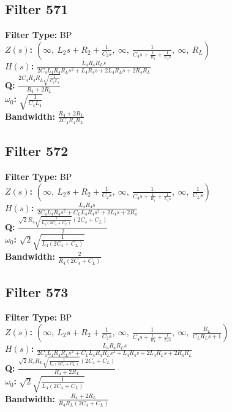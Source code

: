 \documentclass{article}
\begin{document}
\subsection*{Filter 571}
\textbf{Filter Type:} BP \\ 
\textbf{$Z(s)$:} $\left( \infty, \  L_{2} s + R_{2} + \frac{1}{C_{2} s}, \  \infty, \  \frac{1}{C_{4} s + \frac{1}{R_{4}} + \frac{1}{L_{4} s}}, \  \infty, \  R_{L}\right)$ \\ 
\textbf{$H(s)$:} $\frac{L_{4} R_{4} R_{L} s}{2 C_{4} L_{4} R_{4} R_{L} s^{2} + L_{4} R_{4} s + 2 L_{4} R_{L} s + 2 R_{4} R_{L}}$ \\ 
\textbf{Q:} $\frac{2 C_{4} R_{4} R_{L} \sqrt{\frac{1}{C_{4} L_{4}}}}{R_{4} + 2 R_{L}}$ \\ 
\textbf{$\omega_0$:} $\sqrt{\frac{1}{C_{4} L_{4}}}$ \\ 
\textbf{Bandwidth:} $\frac{R_{4} + 2 R_{L}}{2 C_{4} R_{4} R_{L}}$ \\ 
\subsection*{Filter 572}
\textbf{Filter Type:} BP \\ 
\textbf{$Z(s)$:} $\left( \infty, \  L_{2} s + R_{2} + \frac{1}{C_{2} s}, \  \infty, \  \frac{1}{C_{4} s + \frac{1}{R_{4}} + \frac{1}{L_{4} s}}, \  \infty, \  \frac{1}{C_{L} s}\right)$ \\ 
\textbf{$H(s)$:} $\frac{L_{4} R_{4} s}{2 C_{4} L_{4} R_{4} s^{2} + C_{L} L_{4} R_{4} s^{2} + 2 L_{4} s + 2 R_{4}}$ \\ 
\textbf{Q:} $\frac{\sqrt{2} R_{4} \sqrt{\frac{1}{L_{4} \left(2 C_{4} + C_{L}\right)}} \left(2 C_{4} + C_{L}\right)}{2}$ \\ 
\textbf{$\omega_0$:} $\sqrt{2} \sqrt{\frac{1}{L_{4} \left(2 C_{4} + C_{L}\right)}}$ \\ 
\textbf{Bandwidth:} $\frac{2}{R_{4} \left(2 C_{4} + C_{L}\right)}$ \\ 
\subsection*{Filter 573}
\textbf{Filter Type:} BP \\ 
\textbf{$Z(s)$:} $\left( \infty, \  L_{2} s + R_{2} + \frac{1}{C_{2} s}, \  \infty, \  \frac{1}{C_{4} s + \frac{1}{R_{4}} + \frac{1}{L_{4} s}}, \  \infty, \  \frac{R_{L}}{C_{L} R_{L} s + 1}\right)$ \\ 
\textbf{$H(s)$:} $\frac{L_{4} R_{4} R_{L} s}{2 C_{4} L_{4} R_{4} R_{L} s^{2} + C_{L} L_{4} R_{4} R_{L} s^{2} + L_{4} R_{4} s + 2 L_{4} R_{L} s + 2 R_{4} R_{L}}$ \\ 
\textbf{Q:} $\frac{\sqrt{2} R_{4} R_{L} \sqrt{\frac{1}{L_{4} \left(2 C_{4} + C_{L}\right)}} \left(2 C_{4} + C_{L}\right)}{R_{4} + 2 R_{L}}$ \\ 
\textbf{$\omega_0$:} $\sqrt{2} \sqrt{\frac{1}{L_{4} \left(2 C_{4} + C_{L}\right)}}$ \\ 
\textbf{Bandwidth:} $\frac{R_{4} + 2 R_{L}}{R_{4} R_{L} \left(2 C_{4} + C_{L}\right)}$ \\ 
\end{document}
